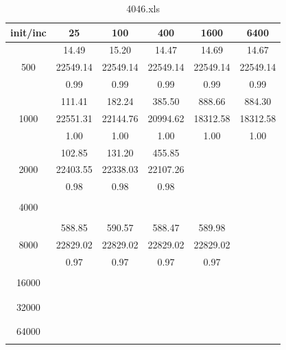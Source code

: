 {\begin{table}[th]
\caption{4046.xls}
\label{tab:4046.xls}
\centering
\begin{tabular}{|c||c|c|c|c|c|}
\hline
init/inc & 25 & 100 & 400 & 1600 & 6400 \\ \hline \hline
  & 14.49 & 15.20 & 14.47 & 14.69 & 14.67\\ 
500  & 22549.14 & 22549.14 & 22549.14 & 22549.14 & 22549.14\\ 
  & 0.99 & 0.99 & 0.99 & 0.99 & 0.99\\ \hline 
  & 111.41 & 182.24 & 385.50 & 888.66 & 884.30\\ 
1000  & 22551.31 & 22144.76 & 20994.62 & 18312.58 & 18312.58\\ 
  & 1.00 & 1.00 & 1.00 & 1.00 & 1.00\\ \hline 
  & 102.85 & 131.20 & 455.85 &  & \\ 
2000  & 22403.55 & 22338.03 & 22107.26 &  & \\ 
  & 0.98 & 0.98 & 0.98 &  & \\ \hline 
  &  &  &  &  & \\ 
4000  &  &  &  &  & \\ 
  &  &  &  &  & \\ \hline 
  & 588.85 & 590.57 & 588.47 & 589.98 & \\ 
8000  & 22829.02 & 22829.02 & 22829.02 & 22829.02 & \\ 
  & 0.97 & 0.97 & 0.97 & 0.97 & \\ \hline 
  &  &  &  &  & \\ 
16000  &  &  &  &  & \\ 
  &  &  &  &  & \\ \hline 
  &  &  &  &  & \\ 
32000  &  &  &  &  & \\ 
  &  &  &  &  & \\ \hline 
  &  &  &  &  & \\ 
64000  &  &  &  &  & \\ 
  &  &  &  &  & \\ \hline 
\end{tabular}
\end{table}
\cleardoublepage

}
